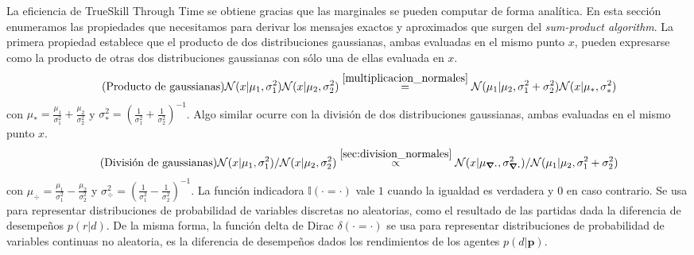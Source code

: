 \documentclass[a4paper,11pt]{book}
\newcommand{\N}{\mathcal{N}}
\theoremstyle{definition}
\newif\ifen
\newcommand{\en}[1]{\ifen#1\fi}
\begin{document}
La eficiencia de TrueSkill Through Time se obtiene gracias que las marginales se pueden computar de forma analítica.
%
En esta secci\'on enumeramos las propiedades que necesitamos para derivar los mensajes exactos y aproximados que surgen del \emph{sum-product algorithm}.
%
La primera propiedad establece que el producto de dos distribuciones gaussianas, ambas evaluadas en el mismo punto $x$, pueden expresarse como la producto de otras dos distribuciones gaussianas con s\'olo una de ellas evaluada en $x$.
%
\begin{equation*}\label{eq:gaussian_product} \tag{\text{Producto de gaussianas}}
\N(x|\mu_1,\sigma_1^2)\N(x|\mu_2,\sigma_2^2) \overset{\ref{multiplicacion_normales}}{=} \N(\mu_1|\mu_2,\sigma_1^2+\sigma_2^2) \N(x|\mu_{*},\sigma_{*}^2)
\end{equation*}
%
con $\mu_{*} = \frac{\mu_1}{\sigma_1^2} + \frac{\mu_2}{\sigma_2^2}$ y $\sigma_{*}^2 = \left(\frac{1}{\sigma_1^2} + \frac{1}{\sigma_2^2} \right)^{-1}$.
%
Algo similar ocurre con la divisi\'on de dos distribuciones gaussianas, ambas evaluadas en el mismo punto $x$.
\begin{equation*}\label{eq:gaussian_division} \tag{\text{Divisi\'on de gaussianas}}
\N(x|\mu_1,\sigma_1^2)/\N(x|\mu_2,\sigma_2^2) \overset{\ref{sec:division_normales}}{\propto} \N(x|\mu_{\div},\sigma_{\div}^2)/\N(\mu_1|\mu_2,\sigma_1^2+\sigma_2^2)
\end{equation*}
%
con $\mu_{\div} = \frac{\mu_1}{\sigma_1^2} - \frac{\mu_2}{\sigma_2^2}$ y $\sigma_{\div}^2 = \left(\frac{1}{\sigma_1^2} - \frac{1}{\sigma_2^2} \right)^{-1}$.
La funci\'on indicadora $\mathbb{I}(\cdot=\cdot)$ vale $1$ cuando la igualdad es verdadera y $0$ en caso contrario.
%
%
Se usa para representar distribuciones de probabilidad de variables discretas no aleatorias, como el resultado de las partidas dada la diferencia de desempeños $p(r|d)$.
%
De la misma forma, la funci\'on delta de Dirac $\delta(\cdot=\cdot)$ se usa para representar distribuciones de probabilidad de variables continuas no aleatoria, es la diferencia de desempeños dados los rendimientos de los agentes $p(d|\bm{p})$.
\end{document}
